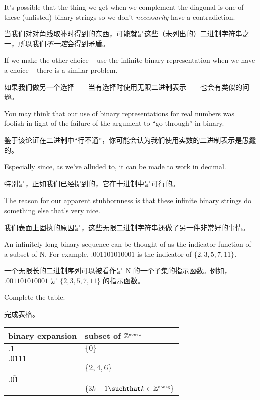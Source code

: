 It's possible that
the thing we get when we complement the diagonal
is one of these (unlisted) binary strings so we don't \emph{necessarily}
have a contradiction.

当我们对对角线取补时得到的东西，可能就是这些（未列出的）二进制字符串之一，所以我们\emph{不一定}会得到矛盾。

If we make the other choice -- use the infinite binary representation
when we have a choice -- there is a similar problem.

如果我们做另一个选择——当有选择时使用无限二进制表示——也会有类似的问题。

You may think that our use of binary representations for real numbers
was foolish in light of the failure of the argument to ``go through''
in binary.

鉴于该论证在二进制中“行不通”，你可能会认为我们使用实数的二进制表示是愚蠢的。

Especially since, as we've alluded to, it can be made to work in decimal.

特别是，正如我们已经提到的，它在十进制中是可行的。

The reason for our apparent stubbornness is that these infinite binary
strings do something else that's very nice.

我们表面上固执的原因是，这些无限二进制字符串还做了另一件非常好的事情。

An infinitely long binary sequence
can be thought of as the indicator function of a subset of N.  For example,
$.001101010001$ is the indicator of $\{2, 3, 5, 7, 11\}$.

一个无限长的二进制序列可以被看作是 N 的一个子集的指示函数。例如，$.001101010001$ 是 $\{2, 3, 5, 7, 11\}$ 的指示函数。

\begin{exer}

    Complete the table.

    完成表格。
    \medskip

    \begin{center}
        \begin{tabular}{l|l}
            binary expansion                       & subset of ${\mathbb Z}^{\mbox{\tiny noneg}}$                  \\ \hline\hline
            \rule[-4pt]{0pt}{20pt} $.1$            & $\{0\}$                                \\\hline
            \rule[-4pt]{0pt}{20pt}$.0111$          &                                        \\\hline
            \rule[-4pt]{0pt}{20pt}                 & $\{2, 4, 6\}$                          \\\hline
            \rule[-4pt]{0pt}{20pt}$.\overline{01}$ &                                        \\\hline
            \rule[-4pt]{0pt}{20pt}                 & $\{3k + 1 \suchthat k \in \Naturals\}$ \\
        \end{tabular}
    \end{center}

\end{exer}


